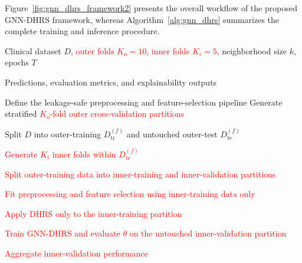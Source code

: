 \documentclass[pdflatex,sn-mathphys-num]{sn-jnl}%
\theoremstyle{thmstyleone}%
\theoremstyle{thmstyletwo}%
\theoremstyle{thmstylethree}%
\begin{document}
Figure~\ref{fig:gnn_dhrs_framework2} presents the overall workflow of the proposed GNN-DHRS framework, whereas Algorithm~\ref{alg:gnn_dhrs} summarizes the complete training and inference procedure.


\begin{algorithm}[!ht]
\caption{Proposed GNN-DHRS Framework for Explainable Imbalanced Brain Stroke Prediction}
\label{alg:gnn_dhrs}
\small
\begin{algorithmic}[1]

\Require Clinical dataset \(D\),
\textcolor{red}{outer folds \(K_o=10\), inner folds \(K_i=5\),}
neighborhood size \(k\), epochs \(T\)

\Ensure Predictions, evaluation metrics, and explainability outputs

\State Define the leakage-safe preprocessing and feature-selection pipeline
\State Generate stratified
\textcolor{red}{\(K_o\)-fold outer cross-validation partitions}


    \State Split \(D\) into outer-training
    \(D_{\mathrm{tr}}^{(f)}\) and untouched outer-test
    \(D_{\mathrm{te}}^{(f)}\)

    \State \textcolor{red}{
    Generate \(K_i\) inner folds within \(D_{\mathrm{tr}}^{(f)}\)
    }

    \For{\textcolor{red}{each candidate configuration \(\theta\)}}

        \For{\textcolor{red}{each inner fold \(g=1,\ldots,K_i\)}}

            \State \textcolor{red}{
            Split outer-training data into inner-training and
            inner-validation partitions
            }

            \State \textcolor{red}{
            Fit preprocessing and feature selection using
            inner-training data only
            }

            \State \textcolor{red}{
            Apply DHRS only to the inner-training partition
            }

            \State \textcolor{red}{
            Train GNN-DHRS and evaluate \(\theta\) on the untouched
            inner-validation partition
            }

        \EndFor

        \State \textcolor{red}{
        Aggregate inner-validation performance
        }

    \EndFor


\end{algorithmic}
\end{algorithm}
\end{document}
